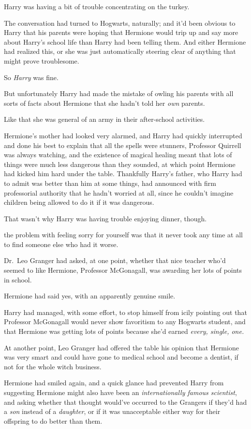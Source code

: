 Harry was having a bit of trouble concentrating on the turkey.

The conversation had turned to Hogwarts, naturally; and it'd been obvious to
Harry that his parents were hoping that Hermione would trip up and say more
about Harry's school life than Harry had been telling them. And either Hermione
had realized this, or she was just automatically steering clear of anything
that might prove troublesome.

So \emph{Harry} was fine.

But unfortunately Harry had made the mistake of owling his parents with all
sorts of facts about Hermione that she hadn't told her \emph{own} parents.

Like that she was general of an army in their after-school activities.

Hermione's mother had looked very alarmed, and Harry had quickly interrupted
and done his best to explain that all the spells were stunners, Professor
Quirrell was always watching, and the existence of magical healing meant that
lots of things were much less dangerous than they sounded, at which point
Hermione had kicked him hard under the table. Thankfully Harry's father, who
Harry had to admit was better than him at some things, had announced with firm
professorial authority that he hadn't worried at all, since he couldn't imagine
children being allowed to do it if it was dangerous.

That wasn't why Harry was having trouble enjoying dinner, though.

{\el} the problem with feeling sorry for yourself was that it never took any
time at all to find someone else who had it worse.

Dr.~Leo Granger had asked, at one point, whether that nice teacher who'd seemed
to like Hermione, Professor McGonagall, was awarding her lots of points in
school.

Hermione had said yes, with an apparently genuine smile.

Harry had managed, with some effort, to stop himself from icily pointing out
that Professor McGonagall would never show favoritism to any Hogwarts student,
and that Hermione was getting lots of points because she'd earned \emph{every,
single, one.}

At another point, Leo Granger had offered the table his opinion that Hermione
was very smart and could have gone to medical school and become a dentist, if
not for the whole witch business.

Hermione had smiled again, and a quick glance had prevented Harry from
suggesting Hermione might also have been an \emph{internationally famous
scientist}, and asking whether that thought would've occurred to the Grangers
if they'd had a \emph{son} instead of a \emph{daughter}, or if it was
unacceptable either way for their offspring to do better than them.

